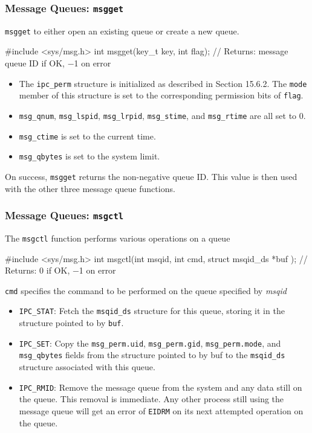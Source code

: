 \documentclass[newPxFont,sthlmFooter,nooffset]{beamer}
\begin{document}
\begin{frame}[t, fragile]
  \frametitle{Message Queues: \texttt{msgget}}
\texttt{msgget} to either open an existing queue or create a new queue.

\begin{codedef}
#include <sys/msg.h>
int msgget(key_t key, int flag);
// Returns: message queue ID if OK, −1 on error
\end{codedef}
{\footnotesize
\begin{itemize}
\item The \texttt{ipc\_perm} structure is initialized as described in Section 15.6.2. The \texttt{mode} member of this structure is set to the corresponding permission bits of \texttt{flag}.
\item  \texttt{msg\_qnum}, \texttt{msg\_lspid}, \texttt{msg\_lrpid}, \texttt{msg\_stime}, and \texttt{msg\_rtime} are all set to 0.
\item \texttt{msg\_ctime} is set to the current time.
\item \texttt{msg\_qbytes} is set to the system limit.
\end{itemize}
}
On success, \texttt{msgget} returns the non-negative queue ID. This value is then used with the other three message queue functions.
\end{frame}



\begin{frame}[t, fragile]
  \frametitle{Message Queues: \texttt{msgctl}}
The \texttt{msgctl} function performs various operations on a queue
\begin{codedef}
#include <sys/msg.h>
int msgctl(int msqid, int cmd, struct msqid_ds *buf );
// Returns: 0 if OK, −1 on error
\end{codedef}
{\footnotesize
\texttt{cmd} specifies the command to be performed on the queue specified by \textit{msqid}
\begin{itemize}
\item \texttt{IPC\_STAT}: Fetch the \texttt{msqid\_ds} structure for this queue, storing it in the structure pointed to by \texttt{buf}.
\item \texttt{IPC\_SET}:  Copy the \texttt{msg\_perm.uid}, \texttt{msg\_perm.gid}, \texttt{msg\_perm.mode}, and \texttt{msg\_qbytes} fields from the structure pointed to by buf to the \texttt{msqid\_ds} structure associated with this queue.
\item \texttt{IPC\_RMID}: Remove the message queue from the system and any data still on the queue. This removal is immediate. Any other process still using the message queue will get an error of \texttt{EIDRM} on its next attempted operation on the queue.
\end{itemize}
}
\end{frame}
\end{document}
